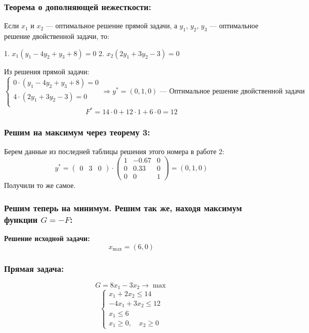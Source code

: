 \documentclass[17pt]{extarticle}
\begin{document}
\subsubsection*{Теорема о дополняющей нежесткости:}
Если \( x_1 \) и \( x_2 \) — оптимальное решение прямой задачи, а \( y_1 \), \( y_2 \), \( y_3 \) — оптимальное решение двойственной задачи, то:

1. \( x_1(y_1 - 4y_2 + y_3 + 8) = 0 \)
2. \( x_2(2y_1 + 3y_2 - 3) = 0 \)

Из решения прямой задачи:
\[
    \begin{cases}
        0 \cdot (y_1 - 4y_2 + y_3 + 8) = 0 \\
        4 \cdot (2y_1 + 3y_2 - 3) = 0      \\
    \end{cases}
    \Rightarrow y^* = (0, 1, 0) \text{ — Оптимальное решение двойственной задачи}
\]
\[
    F^* = 14 \cdot 0 + 12 \cdot 1 + 6 \cdot 0 = 12
\]

\subsubsection*{Решим на максимум через теорему 3:}
Берем данные из последней таблицы решения этого номера в работе 2:
\[
    y^* =
    \begin{pmatrix}
        0 & 3 & 0
    \end{pmatrix}
    \cdot
    \begin{pmatrix}
        1 & -0.67 & 0 \\
        0 & 0.33  & 0 \\
        0 & 0     & 1
    \end{pmatrix}
    = (0, 1, 0)
\]
Получили то же самое.

\subsubsection*{Решим теперь на минимум. Решим так же, находя максимум функции \( G = -F \):}
\textbf{Решение исходной задачи:}
\[
    x_{\text{max}} = (6, 0)
\]

\subsubsection*{Прямая задача:}
\[
    G = 8x_1 - 3x_2 \to \max
\]
\[
    \begin{cases}
        x_1 + 2x_2 \leq 14   \\
        -4x_1 + 3x_2 \leq 12 \\
        x_1 \leq 6           \\
        x_1 \geq 0, \quad x_2 \geq 0
    \end{cases}
\]
\end{document}
